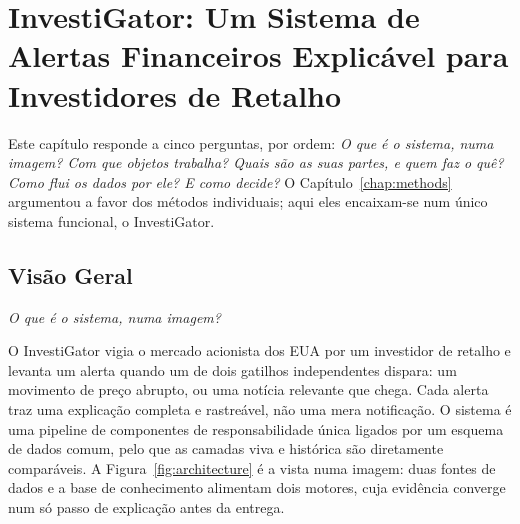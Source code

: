
\chapter{InvestiGator: Um Sistema de Alertas Financeiros Explicável para Investidores de Retalho}
\label{chap:investigator}

Este capítulo responde a cinco perguntas, por ordem: \emph{O que é o sistema, numa imagem? Com que objetos
trabalha? Quais são as suas partes, e quem faz o quê? Como flui os dados por ele? E como decide?}
O Capítulo~\ref{chap:methods} argumentou a favor dos métodos individuais; aqui eles encaixam-se num único
sistema funcional, o InvestiGator.

\section{Visão Geral}
\label{sec:investigator_overview}

\emph{O que é o sistema, numa imagem?}

O InvestiGator vigia o mercado acionista dos EUA por um investidor de retalho e levanta um alerta quando um
de dois gatilhos independentes dispara: um movimento de preço abrupto, ou uma notícia relevante que chega.
Cada alerta traz uma explicação completa e rastreável, não uma mera notificação. O sistema é uma pipeline de
componentes de responsabilidade única ligados por um esquema de dados comum, pelo que as camadas viva e
histórica são diretamente comparáveis. A Figura~\ref{fig:architecture} é a vista numa imagem: duas fontes de
dados e a base de conhecimento alimentam dois motores, cuja evidência converge num só passo de explicação
antes da entrega.

